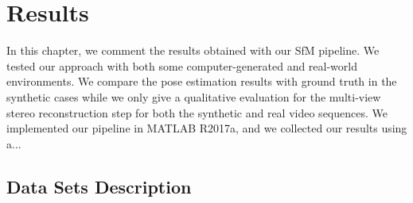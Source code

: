 \chapter{Results}
In this chapter, we comment the results obtained with our SfM pipeline.
We tested our approach with both some computer-generated and real-world environments.
We compare the pose estimation results with ground truth in the synthetic cases
while we only give a qualitative evaluation for the multi-view stereo
reconstruction step for both the synthetic and real video sequences.
We implemented our pipeline in MATLAB R2017a, and we collected our results using a... 

\section{Data Sets Description}
